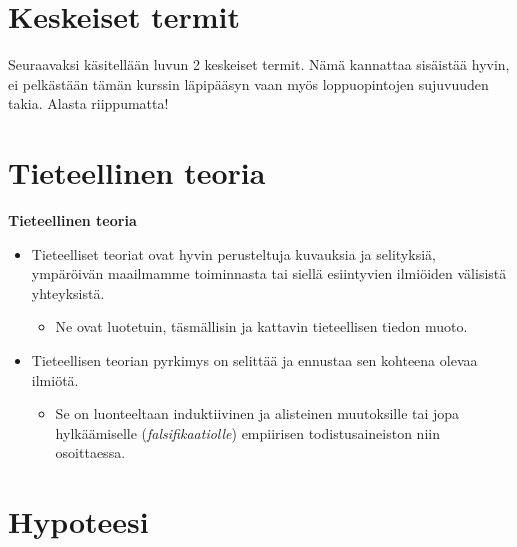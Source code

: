\documentclass[
]{report}
\providecommand{\tightlist}{%
  \setlength{\itemsep}{0pt}\setlength{\parskip}{0pt}}\usepackage{longtable,booktabs,array}
\begin{document}
\hypertarget{keskeiset-termit}{%
\section{Keskeiset termit}\label{keskeiset-termit}}

Seuraavaksi käsitellään luvun 2 keskeiset termit. Nämä kannattaa
sisäistää hyvin, ei pelkästään tämän kurssin läpipääsyn vaan myös
loppuopintojen sujuvuuden takia. Alasta riippumatta!

\hypertarget{tieteellinen-teoria}{%
\section{Tieteellinen teoria}\label{tieteellinen-teoria}}

\begin{defblock}{}

\textbf{Tieteellinen teoria}

\begin{itemize}
\item
  Tieteelliset teoriat ovat hyvin perusteltuja kuvauksia ja selityksiä,
  ympäröivän maailmamme toiminnasta tai siellä esiintyvien ilmiöiden
  välisistä yhteyksistä.

  \begin{itemize}
  \tightlist
  \item
    Ne ovat luotetuin, täsmällisin ja kattavin tieteellisen tiedon
    muoto.
  \end{itemize}
\item
  Tieteellisen teorian pyrkimys on selittää ja ennustaa sen kohteena
  olevaa ilmiötä.

  \begin{itemize}
  \tightlist
  \item
    Se on luonteeltaan induktiivinen ja alisteinen muutoksille tai jopa
    hylkäämiselle (\emph{falsifikaatiolle}) empiirisen todistusaineiston
    niin osoittaessa.
  \end{itemize}
\end{itemize}

\end{defblock}

\hypertarget{hypoteesi}{%
\section{Hypoteesi}\label{hypoteesi}}
\end{document}
